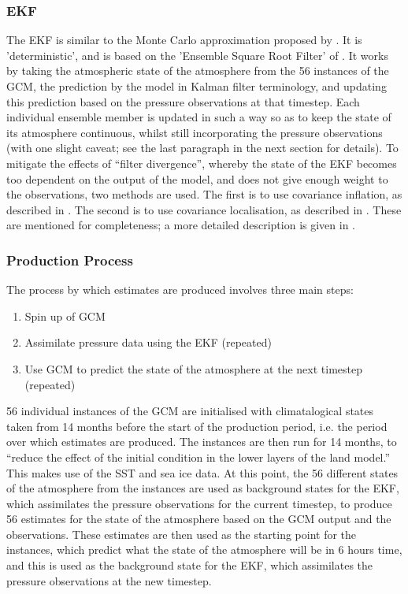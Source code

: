 \documentclass[pdftex,12pt,a4paper]{report}
\begin{document}
\subsubsection{EKF}
The EKF is similar to the Monte Carlo approximation proposed by \textcite{evensen1994sequential,
evensen2003ensemble}. It is 'deterministic', and is based on the 'Ensemble Square Root Filter' of
\textcite{whitaker2002ensemble}. It works by taking the atmospheric state of the atmosphere from the
56 instances of the GCM, the prediction by the model in Kalman filter terminology, and updating this
prediction based on the pressure observations at that timestep. Each individual ensemble member is
updated in such a way so as to keep the state of its atmosphere continuous, whilst still
incorporating the pressure observations (with one slight caveat; see the last paragraph in the next
section for details). To mitigate the effects of ``filter divergence'', whereby the state of the EKF
becomes too dependent on the output of the model, and does not give enough weight to the
observations, two methods are used. The first is to use covariance inflation, as described in
\textcite{whitaker2004reanalysis}. The second is to use covariance localisation, as described in
\textcite{houtekamer2001sequential}. These are mentioned for completeness; a more detailed
description is given in \textcite{compoTwentieth2011}.


\subsubsection{Production Process}
The process by which estimates are produced involves three main steps:

\begin{enumerate}
    \item Spin up of GCM
    \item Assimilate pressure data using the EKF (repeated)
    \item Use GCM to predict the state of the atmosphere at the next timestep (repeated)
\end{enumerate}

56 individual instances of the GCM are initialised with climatalogical states taken from 14 months
before the start of the production period, i.e. the period over which estimates are produced. The
instances are then run for 14 months, to ``reduce the effect of the initial condition in the lower
layers of the land model.'' This makes use of the SST and sea ice data. At this point, the 56
different states of the atmosphere from the instances are used as background states for the EKF,
which assimilates the pressure observations for the current timestep, to produce 56 estimates for
the state of the atmosphere based on the GCM output and the observations. These estimates are then
used as the starting point for the instances, which predict what the state of the atmosphere will be
in 6 hours time, and this is used as the background state for the EKF, which assimilates the
pressure observations at the new timestep.
\end{document}
